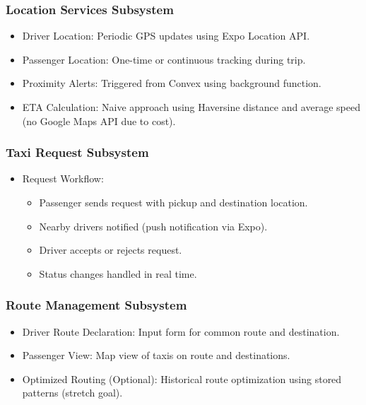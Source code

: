 \documentclass[a4paper,12pt]{article}
\begin{document}
\subsubsection*{Location Services Subsystem}
\begin{itemize}
    \item Driver Location: Periodic GPS updates using Expo Location API.
    \item Passenger Location: One-time or continuous tracking during trip.
    \item Proximity Alerts: Triggered from Convex using background function.
    \item ETA Calculation: Naive approach using Haversine distance and average speed (no Google Maps API due to cost).
\end{itemize}

\subsubsection*{Taxi Request Subsystem}
\begin{itemize}
    \item Request Workflow:
    \begin{itemize}
        \item Passenger sends request with pickup and destination location.
        \item Nearby drivers notified (push notification via Expo).
        \item Driver accepts or rejects request.
        \item Status changes handled in real time.
    \end{itemize}
\end{itemize}

\subsubsection*{Route Management Subsystem}
\begin{itemize}
    \item Driver Route Declaration: Input form for common route and destination.
    \item Passenger View: Map view of taxis on route and destinations.
    \item Optimized Routing (Optional): Historical route optimization using stored patterns (stretch goal).
\end{itemize}
\end{document}
